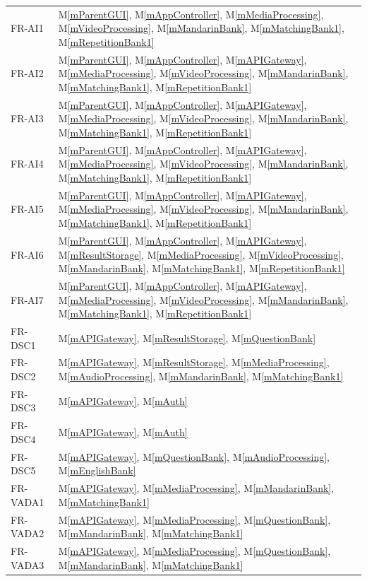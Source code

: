 \documentclass[12pt, titlepage]{article}
\newcommand{\mref}[1]{M\ref{#1}}
\begin{document}
\begin{table}[H]
\begin{tabular}{p{} p{}}
  FR-AI1 & \mref{mParentGUI}, \mref{mAppController}, \mref{mMediaProcessing}, \mref{mVideoProcessing}, 
           \mref{mMandarinBank}, \mref{mMatchingBank1}, \mref{mRepetitionBank1}\\
  FR-AI2 & \mref{mParentGUI}, \mref{mAppController}, \mref{mAPIGateway}, \mref{mMediaProcessing}, 
           \mref{mVideoProcessing}, \mref{mMandarinBank}, \mref{mMatchingBank1}, \mref{mRepetitionBank1}\\
  FR-AI3 & \mref{mParentGUI}, \mref{mAppController}, \mref{mAPIGateway}, \mref{mMediaProcessing}, 
           \mref{mVideoProcessing}, \mref{mMandarinBank}, \mref{mMatchingBank1}, \mref{mRepetitionBank1}\\
  FR-AI4 & \mref{mParentGUI}, \mref{mAppController}, \mref{mAPIGateway}, \mref{mMediaProcessing}, 
           \mref{mVideoProcessing}, \mref{mMandarinBank}, \mref{mMatchingBank1}, \mref{mRepetitionBank1}\\
  FR-AI5 & \mref{mParentGUI}, \mref{mAppController}, \mref{mAPIGateway}, \mref{mMediaProcessing}, 
           \mref{mVideoProcessing}, \mref{mMandarinBank}, \mref{mMatchingBank1}, \mref{mRepetitionBank1}\\
  FR-AI6 & \mref{mParentGUI}, \mref{mAppController}, \mref{mAPIGateway}, \mref{mResultStorage}, 
           \mref{mMediaProcessing}, \mref{mVideoProcessing}, \mref{mMandarinBank}, \mref{mMatchingBank1}, 
           \mref{mRepetitionBank1}\\
  FR-AI7 & \mref{mParentGUI}, \mref{mAppController}, \mref{mAPIGateway}, \mref{mMediaProcessing}, 
           \mref{mVideoProcessing}, \mref{mMandarinBank}, \mref{mMatchingBank1}, \mref{mRepetitionBank1}\\
  
  FR-DSC1 & \mref{mAPIGateway}, \mref{mResultStorage}, \mref{mQuestionBank}\\
  FR-DSC2 & \mref{mAPIGateway}, \mref{mResultStorage}, \mref{mMediaProcessing}, 
            \mref{mAudioProcessing}, \mref{mMandarinBank}, \mref{mMatchingBank1}\\
  FR-DSC3 & \mref{mAPIGateway}, \mref{mAuth}\\
  FR-DSC4 & \mref{mAPIGateway}, \mref{mAuth}\\
  FR-DSC5 & \mref{mAPIGateway}, \mref{mQuestionBank}, \mref{mAudioProcessing}, \mref{mEnglishBank}\\
  
  FR-VADA1 & \mref{mAPIGateway}, \mref{mMediaProcessing}, \mref{mMandarinBank}, \mref{mMatchingBank1}\\
  FR-VADA2 & \mref{mAPIGateway}, \mref{mMediaProcessing}, \mref{mQuestionBank},
             \mref{mMandarinBank}, \mref{mMatchingBank1}\\
  FR-VADA3 & \mref{mAPIGateway}, \mref{mMediaProcessing}, \mref{mQuestionBank}, 
             \mref{mMandarinBank}, \mref{mMatchingBank1}\\
  

\end{tabular}
\end{table}
\end{document}
